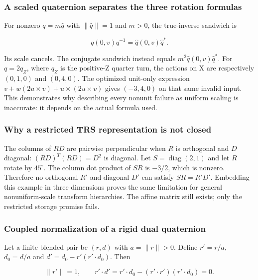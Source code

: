 \subsubsection{A scaled quaternion separates the three rotation formulas}\label{02-foundations-ii-ch039-a-scaled-quaternion-separates-the-three-rotation-formulas}

For nonzero \(q=m\widehat q\) with \(\|\widehat q\|=1\) and \(m>0\), the true-inverse sandwich is

\[
q(0,v)q^{-1}=\widehat q(0,v)\widehat q^*.
\]

Its scale cancels. The conjugate sandwich instead equals \(m^2\widehat q(0,v)\widehat q^*\). For \(q=2q_Z\), where \(q_Z\) is the positive-Z quarter turn, the actions on X are respectively \((0,1,0)\) and \((0,4,0)\). The optimized unit-only expression \(v+w(2u\times v)+u\times(2u\times v)\) gives \((-3,4,0)\) on that same invalid input. This demonstrates why describing every nonunit failure as uniform scaling is inaccurate: it depends on the actual formula used.

\subsubsection{Why a restricted TRS representation is not closed}\label{02-foundations-ii-ch039-why-a-restricted-trs-representation-is-not-closed}

The columns of \(RD\) are pairwise perpendicular when \(R\) is orthogonal and \(D\) diagonal: \((RD)^T(RD)=D^2\) is diagonal. Let \(S=\operatorname{diag}(2,1)\) and let \(R\) rotate by \(45^\circ\). The column dot product of \(SR\) is \(-3/2\), which is nonzero. Therefore no orthogonal \(R'\) and diagonal \(D'\) can satisfy \(SR=R'D'\). Embedding this example in three dimensions proves the same limitation for general nonuniform-scale transform hierarchies. The affine matrix still exists; only the restricted storage promise fails.

\subsubsection{Coupled normalization of a rigid dual quaternion}\label{02-foundations-ii-ch039-coupled-normalization-of-a-rigid-dual-quaternion}

Let a finite blended pair be \((r,d)\) with \(a=\|r\|>0\). Define \(r'=r/a\), \(d_0=d/a\) and \(d'=d_0-r'(r'\cdot d_0)\). Then

\[
\|r'\|=1,\qquad r'\cdot d'=r'\cdot d_0-(r'\cdot r')(r'\cdot d_0)=0.
\]

